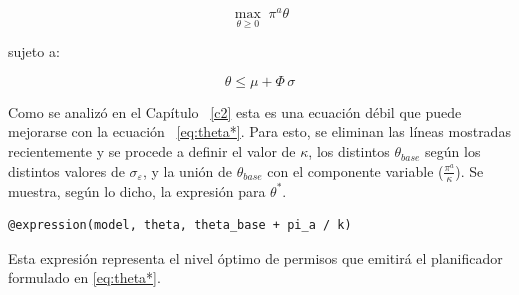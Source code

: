 \[
\max_{\theta \ge 0} \; \pi^a \theta
\]

sujeto a:

\[
\theta \le \mu + \Phi\,\sigma
\]


Como se analizó en el Capítulo ~\ref{c2} esta es una ecuación débil que puede mejorarse con la ecuación ~\ref{eq:theta*}. Para esto, se eliminan las líneas mostradas recientemente y se procede a definir el valor de $\kappa$, los distintos $\theta_{base}$ según los distintos valores de $\sigma_\varepsilon$, y la unión de $\theta_{base}$ con el componente variable ($\frac{\pi^a}{\kappa}$). Se muestra, según lo dicho, la expresión para $\theta^*$.

\begin{verbatim}
@expression(model, theta, theta_base + pi_a / k)
\end{verbatim}

Esta expresión representa el nivel óptimo de permisos que emitirá el planificador formulado en \ref{eq:theta*}.
